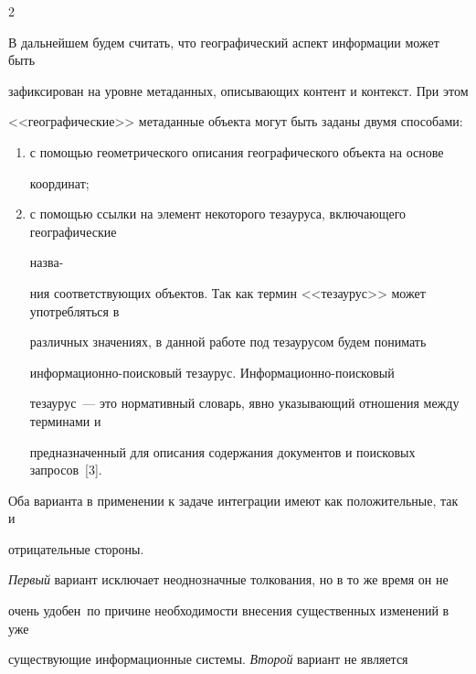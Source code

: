 \begin{multicols}{2}
\begin{enumerate}[(1)]
\end{enumerate}



  В дальнейшем будем считать, что географический аспект информации может быть 

зафиксирован на уровне метаданных, описывающих контент и контекст. При этом 

<<географические>> метаданные объекта могут быть заданы двумя способами:

  \begin{enumerate}[(1)]

\item с помощью геометрического описания географического объекта на основе 

координат;\\[-14pt]

\item с помощью ссылки на элемент некоторого тезауруса, включающего географические 

назва-\linebreak\vspace*{-12pt}



\pagebreak



\noindent

ния соответствующих объектов. Так как термин <<тезаурус>> может употребляться в 

различных значениях, в данной работе под тезаурусом будем понимать 

ин\-фор\-ма\-ци\-он\-но-поиско\-вый тезаурус. Ин\-фор\-ма\-ци\-он\-но-поиско\-вый 

тезаурус~--- это нормативный словарь, явно указывающий отношения между терминами и 

предназначенный для описания содержания документов и поисковых запросов~[3].

  \end{enumerate}

  

  Оба варианта в применении к задаче интеграции имеют как положительные, так и 

отрицательные стороны.

  

  \textit{Первый} вариант исключает неоднозначные толкования, но в то же время он не 

очень удобен~по причине необходимости внесения существенных изменений в уже 

существующие информационные системы. \textit{Второй} вариант не является 


\end{multicols}
